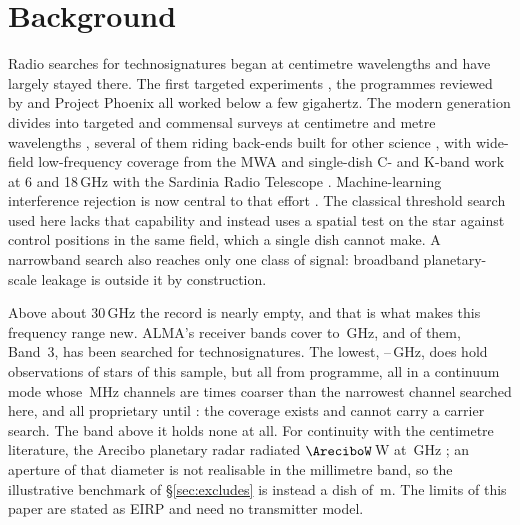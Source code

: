 \section{Background}
\label{sec:background}

Radio searches for technosignatures began at centimetre wavelengths and
have largely stayed there. The first targeted experiments
\citep{CocconiMorrison1959,Drake1960}, the programmes reviewed by
\citet{Tarter2001} and Project Phoenix \citep{Backus2002} all worked
below a few gigahertz. The modern generation divides into targeted and
commensal surveys at centimetre and metre wavelengths
\citep{Zhang2020,Czech2021,FAST3IATLAS2025,LOFARdualsite2023,Choza2024},
several of them riding back-ends built for other science
\citep{Morrison2023}, with wide-field low-frequency coverage from the MWA
\citep{Tremblay2024}
and single-dish C- and K-band work at 6 and 18\,GHz with the Sardinia
Radio Telescope \citep{SRT2025}. Machine-learning interference rejection
is now central to that effort
\citep{Ma2023,GLOBULAR2025,AnomalyParkesGBT2025}. The classical threshold
search used here lacks that capability and instead uses a spatial test on
the star against control positions in the same field, which a single dish
cannot make. A narrowband search also reaches only one class of signal:
broadband planetary-scale leakage \citep{BRaTs2026} is outside it by
construction.

Above about 30\,GHz the record is nearly empty, and that is what makes
this frequency range new. ALMA's \SbNBand{} receiver bands cover
\SbBandLoGHz{} to \SbBandHiGHz\,GHz, and \SbNPriorBandWord{} of them, Band~3,
has been searched for technosignatures. The lowest,
\SbBandOneLoGHz--\SbBandOneHiGHz\,GHz, does hold observations of
\SbBoneNStar{} stars of this sample, but all from \SbBoneNProgWord{}
programme, all in a
continuum mode whose \SbBoneChanMHz\,MHz channels are \SbBoneChanRatio{}
times coarser than the narrowest channel searched here, and all
proprietary until \SbBoneRelYear: the coverage exists and cannot carry a
carrier search. The band above it holds none at all. For continuity with
the centimetre literature, the Arecibo planetary radar radiated
$\AreciboW$\,W at \ArecGHz\,GHz \citep{EarthDetectingEarth2025}; an
aperture of that diameter is not realisable in the millimetre band, so the
illustrative benchmark of \S\ref{sec:excludes} is instead a dish of
\BenchDiam\,m. The limits of this paper are stated as EIRP and need no
transmitter model.


